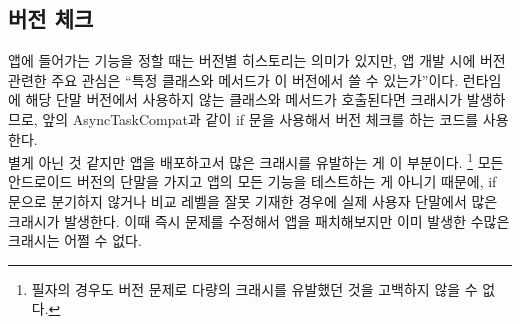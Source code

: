 \subsection{버전 체크}
앱에 들어가는 기능을 정할 때는 버전별 히스토리는 의미가 있지만, 앱 개발 시에 버전 관련한 주요 관심은 ``특정 클래스와 메서드가 이 버전에서 쓸 수 있는가''이다.
런타임에 해당 단말 버전에서 사용하지 않는 클래스와 메서드가 호출된다면 크래시가 발생하므로, 앞의 AsyncTaskCompat과 같이 if 문을 사용해서 버전 체크를 하는 코드를 사용한다.\\

별게 아닌 것 같지만 앱을 배포하고서 많은 크래시를 유발하는 게 이 부분이다.
\footnote{필자의 경우도 버전 문제로 다량의 크래시를 유발했던 것을 고백하지 않을 수 없다.}
모든 안드로이드 버전의 단말을 가지고 앱의 모든 기능을 테스트하는 게 아니기 때문에, if 문으로 분기하지 않거나 비교 레벨을 잘못 기재한 경우에 실제 사용자 단말에서 많은 크래시가 발생한다. 이때 즉시 문제를 수정해서 앱을 패치해보지만 이미 발생한 수많은 크래시는 어쩔 수 없다.\\

